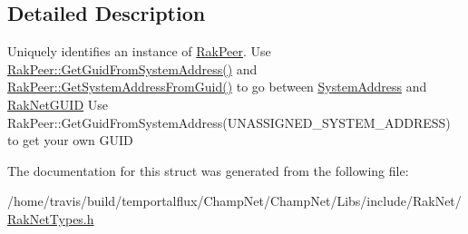 \subsection{Detailed Description}
Uniquely identifies an instance of \hyperlink{class_rak_net_1_1_rak_peer}{Rak\-Peer}. Use \hyperlink{class_rak_net_1_1_rak_peer_a41fcd1175cb8fee67b12835944ed51da}{Rak\-Peer\-::\-Get\-Guid\-From\-System\-Address()} and \hyperlink{class_rak_net_1_1_rak_peer_ac591b0ac4b88b9cdf182fc4769d9de98}{Rak\-Peer\-::\-Get\-System\-Address\-From\-Guid()} to go between \hyperlink{struct_rak_net_1_1_system_address}{System\-Address} and \hyperlink{struct_rak_net_1_1_rak_net_g_u_i_d}{Rak\-Net\-G\-U\-I\-D} Use Rak\-Peer\-::\-Get\-Guid\-From\-System\-Address(\-U\-N\-A\-S\-S\-I\-G\-N\-E\-D\-\_\-\-S\-Y\-S\-T\-E\-M\-\_\-\-A\-D\-D\-R\-E\-S\-S) to get your own G\-U\-I\-D 

The documentation for this struct was generated from the following file\-:\begin{DoxyCompactItemize}
\item 
/home/travis/build/temportalflux/\-Champ\-Net/\-Champ\-Net/\-Libs/include/\-Rak\-Net/\hyperlink{_rak_net_types_8h}{Rak\-Net\-Types.\-h}\end{DoxyCompactItemize}
